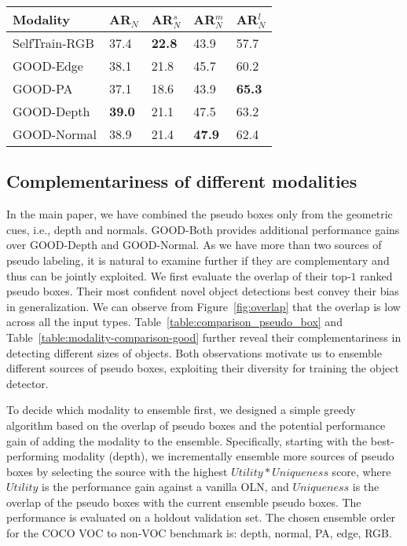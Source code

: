 \documentclass{article} \usepackage{iclr2023_conference,times}
\begin{document}
\begin{table*}[!thbp]
	\begin{center}
\begin{tabular}{l|l|l|l|l}
						\toprule
						Modality &  AR$_N$ & AR$_N^s$  &  AR$_N^m$  & AR$_N^l$  \\ \midrule
       SelfTrain-RGB  & 37.4  & \textbf{22.8} &	43.9 &	57.7 \\ 
GOOD-Edge & 38.1	& 21.8	& 45.7	& 60.2 \\
                             GOOD-PA  & 37.1 & 18.6 & 43.9 & \textbf{65.3} \\
                             GOOD-Depth   &   \textbf{39.0} & 	21.1 &	47.5	 & 63.2\\ 
                             GOOD-Normal &  38.9	& 21.4	& \textbf{47.9} & 62.4 \\
                    \bottomrule
						\end{tabular}
\end{center}
	\caption{\textbf{Comparison of GOOD using different modalities on COCO VOC to non-VOC benchmark.} }
	\label{table:modality-comparison-good}
\end{table*}


\subsection{Complementariness of different modalities}

In the main paper, we have combined the pseudo boxes only from the geometric cues, i.e., depth and normals. GOOD-Both provides additional performance gains over GOOD-Depth and GOOD-Normal. As we have more than two sources of pseudo labeling, it is natural to examine further if they are complementary and thus can be jointly exploited. We first evaluate the overlap of their top-$1$ ranked pseudo boxes. Their most confident novel object detections best convey their bias in generalization. We can observe from Figure~\ref{fig:overlap} that the overlap is low across all the input types. Table~\ref{table:comparison_pseudo_box} and Table~\ref{table:modality-comparison-good} further reveal their complementariness in detecting different sizes of objects. Both observations motivate us to ensemble different sources of pseudo boxes, exploiting their diversity for training the object detector. 

To decide which modality to ensemble first, we designed a simple greedy algorithm based on the overlap of pseudo boxes and the potential performance gain of adding the modality to the ensemble. 
Specifically, starting with the best-performing modality (depth), we incrementally ensemble more sources of pseudo boxes by selecting the source with the highest $Utility * Uniqueness$  score, where $Utility$ is the performance gain against a vanilla OLN, and $Uniqueness$ is the overlap of the pseudo boxes with the current ensemble pseudo boxes. The performance is evaluated on a holdout validation set. The chosen ensemble order for the COCO VOC to non-VOC benchmark is: depth, normal, PA, edge, RGB.
\end{document}

